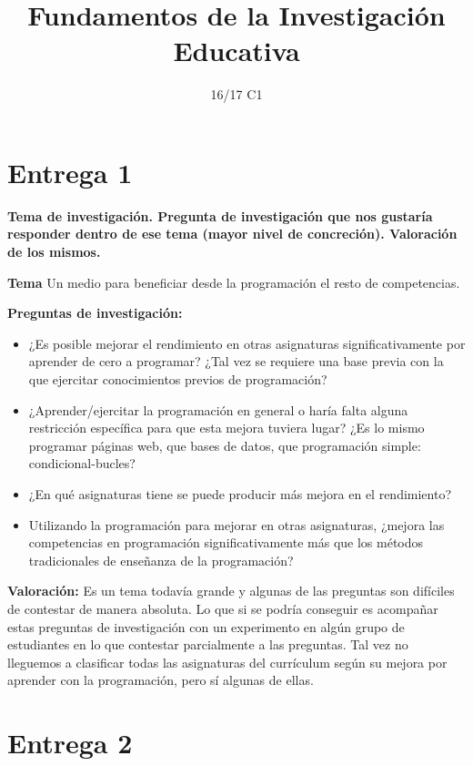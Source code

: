 \documentclass[palatino,nochap]{apuntesURJC}
\title{Fundamentos de la Investigación Educativa}
\author{}
\date{16/17 C1}
\begin{document}
\pagestyle{plain}
\maketitle

\tableofcontents
\newpage


\section{Entrega 1}

\textbf{Tema de investigación. 
%
Pregunta de investigación que nos gustaría responder dentro de ese tema (mayor nivel de concreción).
%
Valoración de los mismos.}

\textbf{Tema} Un medio para beneficiar desde la programación el resto de competencias.

\textbf{Preguntas de investigación: }

\begin{itemize}
\item ¿Es posible mejorar el rendimiento en otras asignaturas significativamente por aprender de cero a programar? ¿Tal vez se requiere una base previa con la que ejercitar conocimientos previos de programación?
\item ¿Aprender/ejercitar la programación en general o haría falta alguna restricción específica para que esta mejora tuviera lugar? ¿Es lo mismo programar páginas web, que bases de datos, que programación simple: condicional-bucles?
\item ¿En qué asignaturas tiene se puede producir más mejora en el rendimiento?
\item Utilizando la programación para mejorar en otras asignaturas, ¿mejora las competencias en programación significativamente más que los métodos tradicionales de enseñanza de la programación?
\end{itemize}

\textbf{Valoración:} Es un tema todavía grande y algunas de las preguntas son difíciles de contestar de manera absoluta. 
%
Lo que si se podría conseguir es acompañar estas preguntas de investigación con un experimento en algún grupo de estudiantes en lo que contestar parcialmente a las preguntas. 
%
Tal vez no lleguemos a clasificar todas las asignaturas del currículum según su mejora por aprender con la programación, pero sí algunas de ellas.

\section{Entrega 2}
\end{document}
